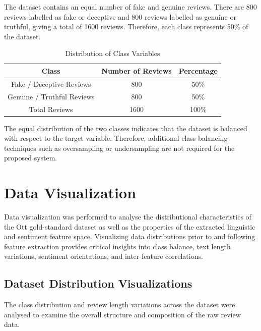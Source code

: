 \documentclass[12pt,a4paper]{report}
\begin{document}
The dataset contains an equal number of fake and genuine reviews. There are 800 reviews labelled as fake or deceptive and 800 reviews labelled as genuine or truthful, giving a total of 1600 reviews. Therefore, each class represents 50\% of the dataset.

\begin{table}[H]
\centering
\renewcommand{\arraystretch}{1.3}
\begin{tabular}{|c|c|c|}
\hline
\textbf{Class} & \textbf{Number of Reviews} & \textbf{Percentage} \\
\hline
Fake / Deceptive Reviews & 800 & 50\% \\
\hline
Genuine / Truthful Reviews & 800 & 50\% \\
\hline
Total Reviews & 1600 & 100\% \\
\hline
\end{tabular}
\caption{Distribution of Class Variables}
\label{tab:classdistribution}
\end{table}

The equal distribution of the two classes indicates that the dataset is balanced with respect to the target variable. Therefore, additional class balancing techniques such as oversampling or undersampling are not required for the proposed system.


\section{Data Visualization}

Data visualization was performed to analyse the distributional characteristics of the Ott gold-standard dataset as well as the properties of the extracted linguistic and sentiment feature space. Visualizing data distributions prior to and following feature extraction provides critical insights into class balance, text length variations, sentiment orientations, and inter-feature correlations.

\subsection*{Dataset Distribution Visualizations}

The class distribution and review length variations across the dataset were analysed to examine the overall structure and composition of the raw review data.
\end{document}

